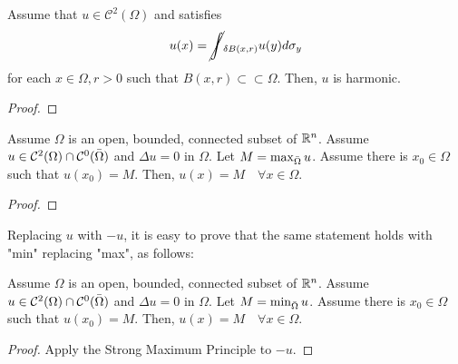 \begin{ThBox}
    \begin{Th}
        Assume that $u \in \mathcal{C}^2(\Omega)$ and satisfies 
        \begin{equation*}
            u(x) = \cancel{\int}_{\delta B(x,r)} u(y) d\sigma_y
        \end{equation*}
        for each $x \in \Omega, r > 0$ such that $B(x,r) \subset \subset \Omega$. Then, $u$ is harmonic. 
    \end{Th}
\end{ThBox}
\begin{ProofBox}
    \begin{proof}
        
    \end{proof}
\end{ProofBox}
\begin{ThBox}
    \begin{Th}
        Assume $\Omega$ is an open, bounded, connected subset of $\mathbb{R}^n$. Assume $u \in \mathcal{C}^2(\Omega) \cap \mathcal{C}^0(\Bar{\Omega})$ and $\Delta u = 0$ in $\Omega$. Let $M = \max_{\Bar{\Omega}} u$. Assume there is $x_0 \in \Omega$ such that $u(x_0) = M$. Then, $u(x) = M \quad \forall x \in \Omega$. 
    \end{Th}
\end{ThBox}
\begin{ProofBox}
    \begin{proof}
        
    \end{proof}
\end{ProofBox}
Replacing $u$ with $-u$, it is easy to prove that the same statement holds with "min" replacing "max", as follows:
\begin{PropBox}
    \begin{Cor}
        Assume $\Omega$ is an open, bounded, connected subset of $\mathbb{R}^n$. Assume $u \in \mathcal{C}^2(\Omega) \cap \mathcal{C}^0(\Bar{\Omega})$ and $\Delta u = 0$ in $\Omega$. Let $M = \min_{\Bar{\Omega}} u$. Assume there is $x_0 \in \Omega$ such that $u(x_0) = M$. Then, $u(x) = M \quad \forall x \in \Omega$. 
    \end{Cor}
\end{PropBox}
\begin{ProofBox}
    \begin{proof}
        Apply the Strong Maximum Principle to $-u$. 
    \end{proof}
\end{ProofBox}
